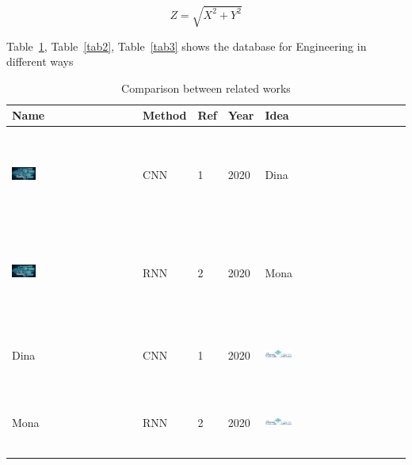 \begin{equation}
Z=\sqrt{X^{2}+Y^{2}}  
\label{eq1}
\end{equation}


Table~\ref{tab1}, Table~\ref{tab2}, Table~\ref{tab3} shows the database for Engineering in different ways


\begin{table}[ht]
\caption{Comparison between related works}
\begin{center}
\begin{tabular}{lllll}
\hline
Name & Method & Ref & Year & Idea                                           \\ \hline
\includegraphics[width=0.2\textwidth, height=30mm]{figures/samples/it.png}   & CNN    & 1   & 2020 &  Dina \\
\includegraphics[width=0.2\textwidth, height=30mm]{figures/samples/it.png}  & RNN    & 2   & 2020 & Mona \\
Dina & CNN    & 1   & 2020 & \includegraphics[width=0.2\textwidth, height=20mm]{figures/samples/qu.png} \\
Mona & RNN    & 2   & 2020 &  \includegraphics[width=0.2\textwidth, height=20mm]{figures/samples/qu.png} \\ \hline
\end{tabular}
    \end{center}
\label{tab1}
\end{table}

